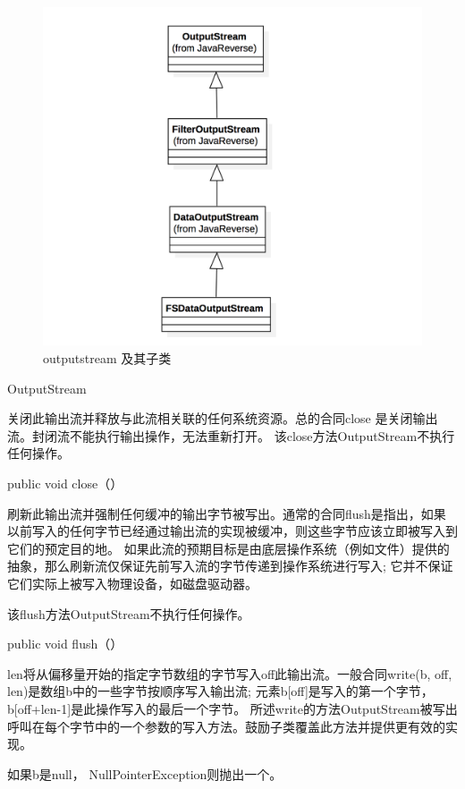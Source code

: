 \begin{figure}[h]
\centering
\includegraphics[width =1\linewidth]
{11.png}
\caption{outputstream 及其子类}
\label{fig:OutputStream}
\end{figure}

OutputStream

关闭此输出流并释放与此流相关联的任何系统资源。总的合同close 是关闭输出流。封闭流不能执行输出操作，无法重新打开。
该close方法OutputStream不执行任何操作。
\begin{java}
public void close（）
\end{java}
刷新此输出流并强制任何缓冲的输出字节被写出。通常的合同flush是指出，如果以前写入的任何字节已经通过输出流的实现被缓冲，则这些字节应该立即被写入到它们的预定目的地。
如果此流的预期目标是由底层操作系统（例如文件）提供的抽象，那么刷新流仅保证先前写入流的字节传递到操作系统进行写入; 它并不保证它们实际上被写入物理设备，如磁盘驱动器。

该flush方法OutputStream不执行任何操作。
\begin{java}
public void flush（）
\end{java}
len将从偏移量开始的指定字节数组的字节写入off此输出流。一般合同write(b, off, len)是数组b中的一些字节按顺序写入输出流; 元素b[off]是写入的第一个字节，b[off+len-1]是此操作写入的最后一个字节。
所述write的方法OutputStream被写出呼叫在每个字节中的一个参数的写入方法。鼓励子类覆盖此方法并提供更有效的实现。

如果b是null， NullPointerException则抛出一个。

